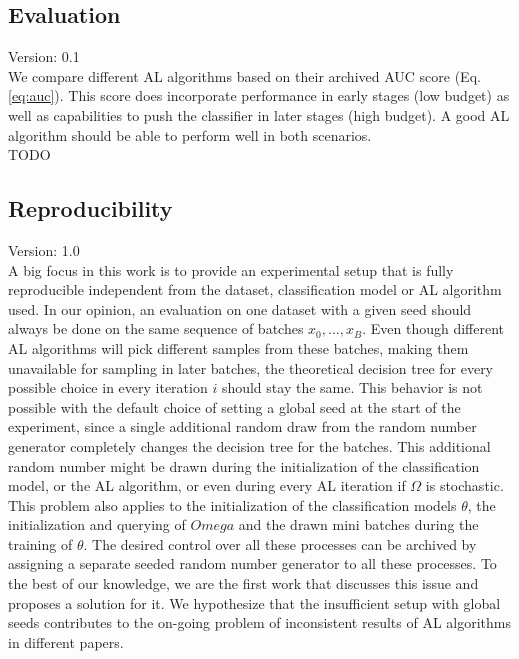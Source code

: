 \documentclass[]{article}
\begin{document}
\subsection{Evaluation}\label{sec:evaluation}
{\color{red} Version: 0.1}\\
We compare different AL algorithms based on their archived AUC score (Eq. \ref{eq:auc}).
This score does incorporate performance in early stages (low budget) as well as capabilities to push the classifier in later stages (high budget).
A good AL algorithm should be able to perform well in both scenarios. \\
{\color{red} TODO}

\subsection{Reproducibility}\label{sec:reproducibility}
{\color{red} Version: 1.0}\\
A big focus in this work is to provide an experimental setup that is fully reproducible independent from the dataset, classification model or AL algorithm used.
In our opinion, an evaluation on one dataset with a given seed should always be done on the same sequence of batches $x_0, \ldots, x_B$.
Even though different AL algorithms will pick different samples from these batches, making them unavailable for sampling in later batches, the theoretical decision tree for every possible choice in every iteration $i$ should stay the same.
This behavior is not possible with the default choice of setting a global seed at the start of the experiment, since a single additional random draw from the random number generator completely changes the decision tree for the batches.
This additional random number might be drawn during the initialization of the classification model, or the AL algorithm, or even during every AL iteration if $\Omega$ is stochastic.
This problem also applies to the initialization of the classification models $\theta$, the initialization and querying of $Omega$ and the drawn mini batches during the training of $\theta$.
The desired control over all these processes can be archived by assigning a separate seeded random number generator to all these processes.
To the best of our knowledge, we are the first work that discusses this issue and proposes a solution for it.
We hypothesize that the insufficient setup with global seeds contributes to the on-going problem of inconsistent results of AL algorithms in different papers.
\end{document}
